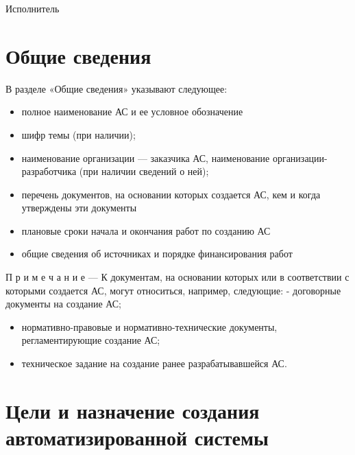 {{{{\begin{flushright}
\begin{minipage}[t]{0.4\textwidth}
        \vspace{3mm}
        \makebox[6cm][r]{<<\rule{7mm}{0.4pt}>>\hrulefill~\the\year}
      \end{minipage}
    \end{flushright}
    \vspace{10mm}
    \begin{flushright}
      \begin{minipage}[t]{0.4\textwidth}
        Исполнитель

        \vspace{3mm}
        \makebox[6cm][r]{<<\rule{7mm}{0.4pt}>>\hrulefill~\the\year}
      \end{minipage}
    \end{flushright}
  }
}
\newpage
}
\section{Общие сведения}
В разделе «Общие сведения» указывают следующее:
\begin{itemize}
    \item полное наименование АС и ее условное обозначение
    \item шифр темы (при наличии);
    \item наименование организации — заказчика АС, наименование организации-разработчика (при наличии сведений о ней);
    \item перечень документов, на основании которых создается АС, кем и когда утверждены эти документы
    \item плановые сроки начала и окончания работ по созданию АС
    \item общие сведения об источниках и порядке финансирования работ
\end{itemize}

П р и м е ч а н и е — К документам, на основании которых или в соответствии с которыми создается АС, могут относиться, например, следующие:
- договорные документы на создание АС;
\begin{itemize}
  \item нормативно-правовые и нормативно-технические документы, регламентирующие создание АС;
  \item техническое задание на создание ранее разрабатывавшейся АС.
\end{itemize}
\section{Цели и назначение создания автоматизированной системы}

}
